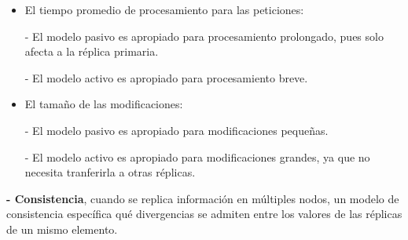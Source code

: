 \documentclass[12pt]{amsart}
\begin{document}
    \begin{itemize}
        \item El tiempo promedio de procesamiento para las peticiones:
        
        - El modelo pasivo es apropiado para procesamiento prolongado, pues solo afecta a la réplica primaria.
        
        - El modelo activo es apropiado para procesamiento breve.
        
        \item El tamaño de las modificaciones:
        
        - El modelo pasivo es apropiado para modificaciones pequeñas.
        
        - El modelo activo es apropiado para modificaciones grandes, ya que no necesita tranferirla a otras réplicas.
    \end{itemize}
    
    \textbf{- Consistencia}, cuando se replica información en múltiples nodos, un modelo de consistencia específica qué divergencias se admiten entre los valores de las réplicas de un mismo elemento. 
    
\end{document}
